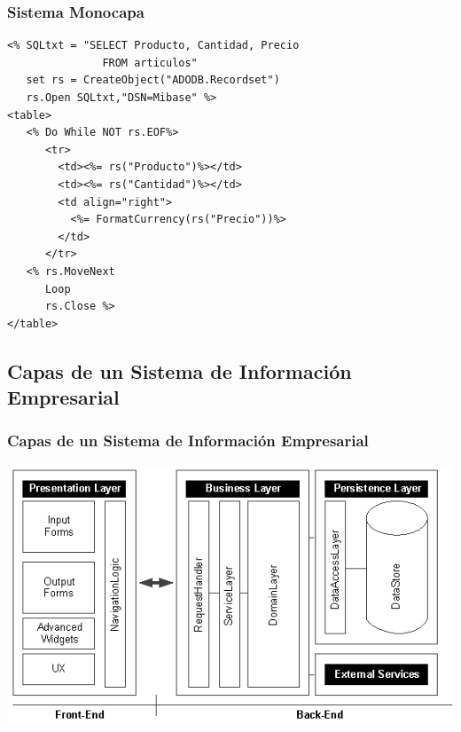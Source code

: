 \documentclass[a4paper,t,xcolor=pst,dvips,colortheme]{beamer}
\begin{document}
\begin{frame}[c,fragile]
	\frametitle{Sistema Monocapa}
    \begin{lstlisting}[basicstyle=\small]
<% SQLtxt = "SELECT Producto, Cantidad, Precio
               FROM articulos"
   set rs = CreateObject("ADODB.Recordset")
   rs.Open SQLtxt,"DSN=Mibase" %>
<table>
   <% Do While NOT rs.EOF%>
      <tr>
        <td><%= rs("Producto")%></td>
        <td><%= rs("Cantidad")%></td>
        <td align="right">
          <%= FormatCurrency(rs("Precio"))%>
        </td>
      </tr>
   <% rs.MoveNext
      Loop
      rs.Close %>
</table>
    \end{lstlisting}
\end{frame}


\subsection[Capas de un SIE]{Capas de un Sistema de Información Empresarial}

\begin{frame}[c]
	\frametitle{Capas de un Sistema de Información Empresarial}
	\begin{center}
        \includegraphics[width=\linewidth,keepaspectratio=true]{images/enterpriseLayers/enterpriseLayers.eps}
	\end{center}
\end{frame}
\end{document}
